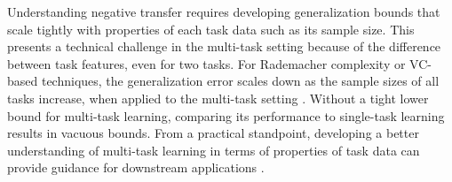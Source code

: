 Understanding negative transfer requires developing generalization bounds that scale tightly with properties of each task data such as its sample size.
This presents a technical challenge in the multi-task setting because of the difference between task features, even for two tasks.
For Rademacher complexity or VC-based techniques, the generalization error scales down as the sample sizes of all tasks increase, when applied to the multi-task setting \cite{B00,AZ05,M06,MPR16,WZR20}.
Without a tight lower bound for multi-task learning, comparing its performance to single-task learning results in vacuous bounds.
From a practical standpoint, developing a better understanding of multi-task learning in terms of properties of task data can provide guidance for downstream applications \cite{RH19}.

